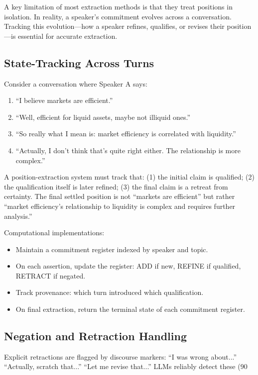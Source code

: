 \documentclass[11pt,letterpaper]{article}
\begin{document}
A key limitation of most extraction methods is that they treat positions in isolation. In reality, a speaker's commitment evolves across a conversation. Tracking this evolution—how a speaker refines, qualifies, or revises their position—is essential for accurate extraction.

\subsection{State-Tracking Across Turns}

Consider a conversation where Speaker A says:

\begin{enumerate}
  \item[Turn 1:] ``I believe markets are efficient.''
  \item[Turn 5:] ``Well, efficient for liquid assets, maybe not illiquid ones.''
  \item[Turn 12:] ``So really what I mean is: market efficiency is correlated with liquidity.''
  \item[Turn 18:] ``Actually, I don't think that's quite right either. The relationship is more complex.''
\end{enumerate}

A position-extraction system must track that: (1) the initial claim is qualified; (2) the qualification itself is later refined; (3) the final claim is a retreat from certainty. The final settled position is not ``markets are efficient'' but rather ``market efficiency's relationship to liquidity is complex and requires further analysis.''

Computational implementations:
\begin{itemize}
  \item Maintain a commitment register indexed by speaker and topic.
  \item On each assertion, update the register: ADD if new, REFINE if qualified, RETRACT if negated.
  \item Track provenance: which turn introduced which qualification.
  \item On final extraction, return the terminal state of each commitment register.
\end{itemize}

\subsection{Negation and Retraction Handling}

Explicit retractions are flagged by discourse markers: ``I was wrong about...'' ``Actually, scratch that...'' ``Let me revise that...'' LLMs reliably detect these (90%
\end{document}
